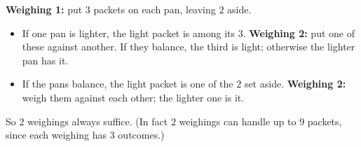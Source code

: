 \textbf{Weighing 1:} put $3$ packets on each pan, leaving $2$ aside.
\begin{itemize}
\item If one pan is lighter, the light packet is among its $3$. \textbf{Weighing 2:} put one of these against another. If they balance, the third is light; otherwise the lighter pan has it.
\item If the pans balance, the light packet is one of the $2$ set aside. \textbf{Weighing 2:} weigh them against each other; the lighter one is it.
\end{itemize}
So $2$ weighings always suffice. (In fact $2$ weighings can handle up to $9$ packets, since each weighing has $3$ outcomes.)
